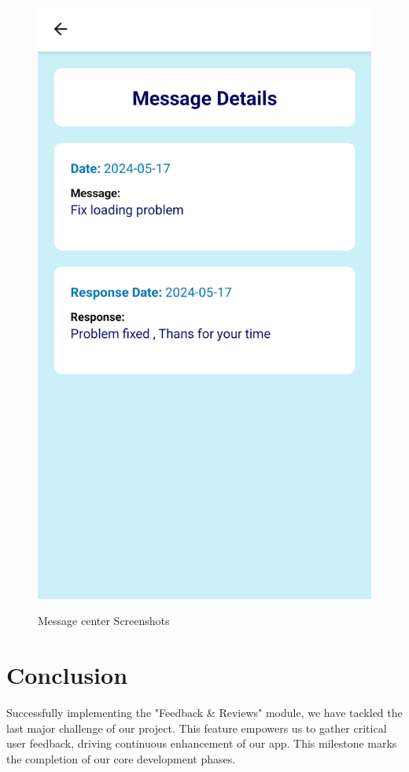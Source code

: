 \begin{figure}[H]
\begin{minipage}{0.35\textwidth}
    \includegraphics[width=\linewidth]{images/sprint4/feedBackModule (3).png}
    \label{fig:login-form}
\end{minipage}\hfill
    \caption{Message center Screenshots}
\end{figure}


\section*{Conclusion}

Successfully implementing the "Feedback \& Reviews" module, we have tackled the last major challenge of our project. This feature empowers us to gather critical user feedback, driving continuous enhancement of our app. This milestone marks the completion of our core development phases.
